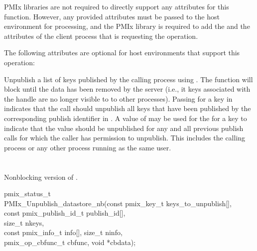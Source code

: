 \returnsimple

\reqattrstart
\ac{PMIx} libraries are not required to directly support any attributes for this function. However, any provided attributes must be passed to the host environment for processing, and the \ac{PMIx} library is required to add the  and the  attributes of the client process that is requesting the operation.

\reqattrend

\optattrstart
The following attributes are optional for host environments that support this operation:


\optattrend

\descr

Unpublish a list of keys published by the calling process using .
The function will block until the data has been removed by the server (i.e., it keys associated with the handle are no longer visible to to other processes).  Passing  for a key in  indicates that the 
call should unpublish all keys that have been published by the corresponding publish identifier in 
.
A value of  may be used for the  for a key to indicate that the value should 
be unpublished for any and all previous publish calls for which the caller has permission to unpublish.  This includes the calling process or any other process running as the same user.  

\section{}

\summary

Nonblocking version of .

\format

\cspecificstart
\begin{codepar}
pmix_status_t \\
PMIx_Unpublish_datastore_nb(const pmix_key_t keys_to_unpublish[], \\
\hspace*{15\sigspace}const pmix_publish_id_t publish_id[], \\
\hspace*{15\sigspace}size_t nkeys, \\
\hspace*{15\sigspace}const pmix_info_t info[], size_t ninfo, \\
\hspace*{18\sigspace}pmix_op_cbfunc_t cbfunc, void *cbdata);
\end{codepar}
\cspecificend

